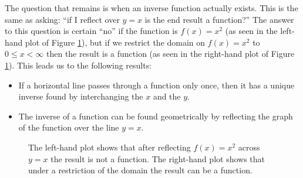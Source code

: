 The question that remains is when an inverse function actually exists.  This is the same
as asking: ``if I reflect over $y=x$ is the end result a function?''  The answer to this
question is certain ``no'' if the function is $f(x) = x^2$ (as seen in the left-hand plot
of Figure \ref{fig:0.3.inv2}), but if we restrict the domain on $f(x) = x^2$ to $0 \le x < \infty$ then
the result is a function (as seen in the right-hand plot of Figure \ref{fig:0.3.inv2}).
This leads us to the following results:
\begin{itemize}
    \item If a horizontal line passes through a function only once, then it has a unique
        inverse found by interchanging the $x$ and the $y$.
    \item The inverse of a function can be found geometrically by reflecting the graph of
        the function over the line $y=x$.
\end{itemize}
\begin{figure}[ht!]
    \begin{center}
    \end{center}
    \caption{The left-hand plot shows that after reflecting $f(x)=x^2$ across $y=x$ the
    result is not a function.  The right-hand plot shows that under a restriction of the
domain the result can be a function.}
    \label{fig:0.3.inv2}
\end{figure}

